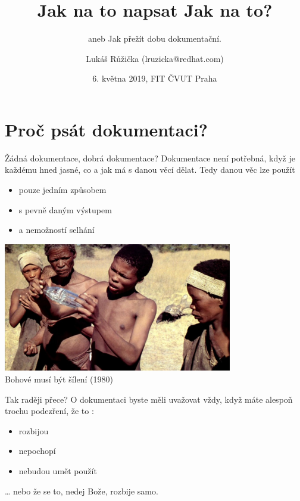 \documentclass[12pt]{beamer}
\title{Jak na to napsat Jak na to?}
\subtitle{aneb Jak přežít dobu dokumentační.}
\author{Lukáš Růžička (lruzicka@redhat.com)}
\date{6. května 2019, FIT ČVUT Praha}
\begin{document}
\begin{frame}[plain]
\maketitle
\end{frame}

    \section{Proč psát dokumentaci?}
    
    	\begin{frame}{Žádná dokumentace, dobrá dokumentace?}
    	  Dokumentace není potřebná, když je každému hned jasné, co a jak má s danou věcí dělat. Tedy danou věc lze použít
    	  
    	  \begin{itemize}
    	  	\item pouze jedním způsobem
    	  	\item s pevně daným výstupem
    	  	\item a nemožností selhání
    	  \end{itemize}
		\end{frame}
	
		\begin{frame}
			\begin{center}
				\includegraphics[width=10cm]{lahev_bohove.jpg}	\\
				Bohové musí být šílení (1980)
			\end{center}
		\end{frame}
	
		\begin{frame}{Tak raději přece?}
                O dokumentaci byste měli uvažovat vždy, když máte alespoň trochu podezření, že to :
		   \begin{itemize}
		   	\item rozbijou
		   	\item nepochopí
		   	\item nebudou umět použít
		   \end{itemize}
            \ldots{} nebo že se to, nedej Bože, rozbije samo.
		\end{frame}
	
\end{document}
